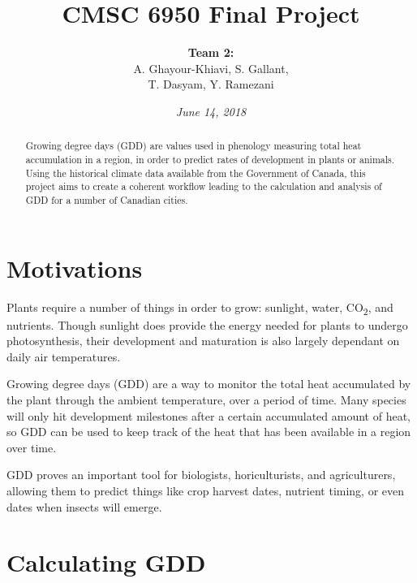 \documentclass[12pt]{article}
\title{CMSC 6950 Final Project}
\author{
        \textbf{Team 2:}\\
        A. Ghayour-Khiavi, S. Gallant,\\
        T. Dasyam, Y. Ramezani \\
        \and
}
\date{\textit{June 14, 2018}}
\begin{document}
\maketitle


\begin{abstract}
Growing degree days (GDD) are values used in phenology measuring total heat accumulation in a region, in order to predict rates of development in  plants or animals. Using the historical climate data available from the Government of Canada, this project aims to create a coherent workflow leading to the calculation and analysis of GDD for a number of Canadian cities.  
\end{abstract}

\smallskip

\tableofcontents

\pagebreak

\section{Motivations}\label{motivations}

Plants require a number of things in order to grow: sunlight, 
water, CO\textsubscript{2}, and nutrients. Though sunlight does provide the energy 
needed for plants to undergo photosynthesis, their development and maturation 
is also largely dependant on daily air temperatures.

\bigskip
\par 
Growing degree days (GDD) are a way to monitor the total heat 
accumulated by the plant through the ambient temperature, over a 
period of time. Many species will only hit development milestones 
after a certain accumulated amount of heat, so GDD can be used to 
keep track of the heat that has been available in a region over time. 

\bigskip
\par 
GDD proves an important tool for biologists, horiculturists, and agriculturers, 
allowing them to predict things like crop harvest dates, 
nutrient timing, or even dates when insects will emerge.    

\pagebreak


\section{Calculating GDD}\label{core tasks}
\end{document}
